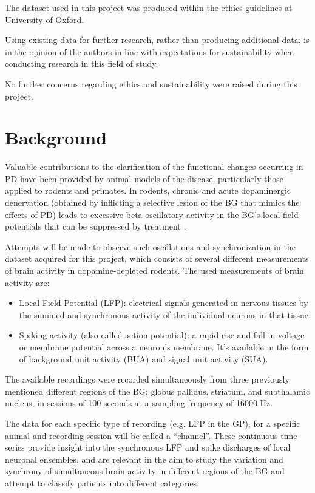\documentclass{kththesis}
\begin{document}
The dataset used in this project was produced within the ethics guidelines at University of Oxford.

Using existing data for further research, rather than producing additional data, is in the opinion of the authors in line with expectations for sustainability when conducting research in this field of study.

No further concerns regarding ethics and sustainability were raised during this project.

\newpage
\chapter{Background}

Valuable contributions to the clarification of the functional changes occurring in PD have been provided by animal models of the disease, particularly those applied to rodents and primates. 
In rodents, chronic and acute dopaminergic denervation (obtained by inflicting a selective lesion of the BG that mimics the effects of PD) leads to excessive beta oscillatory activity in the BG's local field potentials that can be suppressed by treatment \parencite{Mallet}.

Attempts will be made to observe such oscillations and synchronization in the dataset acquired for this project, which consists of several different measurements of brain activity in dopamine-depleted rodents. 
The used measurements of brain activity are:

\begin{itemize}
    \item Local Field Potential (LFP): electrical signals generated in nervous tissues by the summed and synchronous activity of the individual neurons in that tissue.
    \item Spiking activity (also called action potential): a rapid rise and fall in voltage or membrane potential across a neuron's membrane. It's available in the form of background unit activity (BUA) and signal unit activity (SUA).
\end{itemize}

The available recordings were recorded simultaneously from three previously mentioned different regions of the BG; globus pallidus, striatum, and subthalamic nucleus, in sessions of 100 seconds at a sampling frequency of 16000 Hz.

The data for each specific type of recording (e.g. LFP in the GP), for a specific animal and recording session will be called a “channel”. 
These continuous time series provide insight into the synchronous LFP and spike discharges of local neuronal ensembles, and are relevant in the aim to study the variation and synchrony of simultaneous brain activity in different regions of the BG and attempt to classify patients into different categories.
\end{document}
